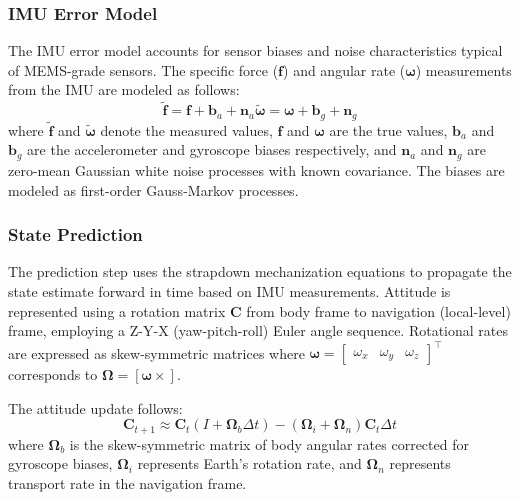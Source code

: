 \documentclass[letterpaper,times]{IONconf}
\begin{document}
\subsubsection{IMU Error Model}

The IMU error model accounts for sensor biases and noise characteristics typical of MEMS-grade sensors. The specific force (\(\mathbf{f}\)) and angular rate (\(\boldsymbol{\omega}\)) measurements from the IMU are modeled as follows:
\begin{subequations}\label{eqn:imu_models_rbpf}
\begin{equation}
\tilde{\mathbf{f}} = \mathbf{f} + \mathbf{b}_a + \mathbf{n}_a
\end{equation}
\begin{equation}
\tilde{\boldsymbol{\omega}} = \boldsymbol{\omega} + \mathbf{b}_g + \mathbf{n}_g
\end{equation}
\end{subequations}
where \(\tilde{\mathbf{f}}\) and \(\tilde{\boldsymbol{\omega}}\) denote the measured values, \(\mathbf{f}\) and \(\boldsymbol{\omega}\) are the true values, \(\mathbf{b}_a\) and \(\mathbf{b}_g\) are the accelerometer and gyroscope biases respectively, and \(\mathbf{n}_a\) and \(\mathbf{n}_g\) are zero-mean Gaussian white noise processes with known covariance. The biases are modeled as first-order Gauss-Markov processes.

\subsubsection{State Prediction}

The prediction step uses the strapdown mechanization equations to propagate the state estimate forward in time based on IMU measurements. Attitude is represented using a rotation matrix \(\mathbf{C}\) from body frame to navigation (local-level) frame, employing a Z-Y-X (yaw-pitch-roll) Euler angle sequence. Rotational rates are expressed as skew-symmetric matrices where \(\boldsymbol{\omega} = \begin{bmatrix} \omega_x & \omega_y & \omega_z \end{bmatrix}^\intercal\) corresponds to \(\boldsymbol{\Omega} = [\boldsymbol{\omega}\times]\).

The attitude update follows:
\begin{equation}\label{eqn:attitude_update_rbpf}
\mathbf{C}_{t+1} \approx \mathbf{C}_t \left( I + \boldsymbol{\Omega}_{b} \Delta t \right) - \left( \boldsymbol{\Omega}_{i} + \boldsymbol{\Omega}_{n} \right) \mathbf{C}_t \Delta t
\end{equation}
where \(\boldsymbol{\Omega}_{b}\) is the skew-symmetric matrix of body angular rates corrected for gyroscope biases, \(\boldsymbol{\Omega}_{i}\) represents Earth's rotation rate, and \(\boldsymbol{\Omega}_{n}\) represents transport rate in the navigation frame.
\end{document}
